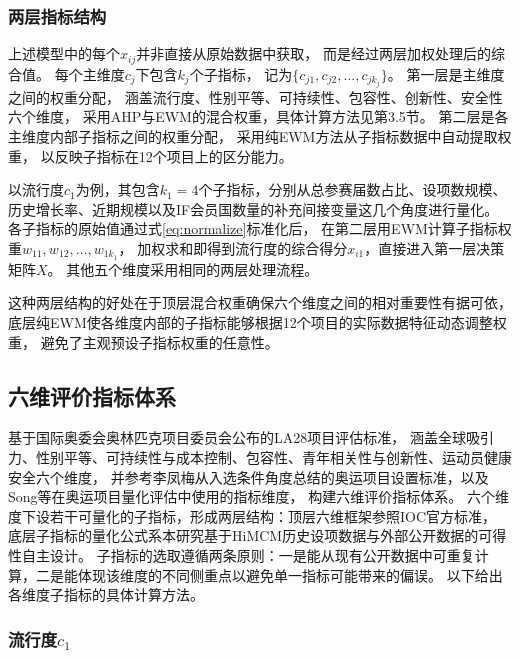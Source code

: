 \documentclass[twoside]{CUGThesis}
\begin{document}
\subsubsection{两层指标结构}

上述模型中的每个$x_{ij}$并非直接从原始数据中获取，
而是经过两层加权处理后的综合值。
每个主维度$c_j$下包含$k_j$个子指标，
记为$\{c_{j1}, c_{j2}, \ldots, c_{jk_j}\}$。
第一层是主维度之间的权重分配，
涵盖流行度、性别平等、可持续性、包容性、创新性、安全性六个维度，
采用AHP与EWM的混合权重，具体计算方法见第3.5节。
第二层是各主维度内部子指标之间的权重分配，
采用纯EWM方法从子指标数据中自动提取权重，
以反映子指标在12个项目上的区分能力。

以流行度$c_1$为例，其包含$k_1 = 4$个子指标，分别从总参赛届数占比、设项数规模、历史增长率、近期规模以及IF会员国数量的补充间接变量这几个角度进行量化。
各子指标的原始值通过式\eqref{eq:normalize}标准化后，
在第二层用EWM计算子指标权重$w_{11}, w_{12}, \ldots, w_{1k_1}$，
加权求和即得到流行度的综合得分$x_{i1}$，直接进入第一层决策矩阵$X$。
其他五个维度采用相同的两层处理流程。

这种两层结构的好处在于顶层混合权重确保六个维度之间的相对重要性有据可依，
底层纯EWM使各维度内部的子指标能够根据12个项目的实际数据特征动态调整权重，
避免了主观预设子指标权重的任意性。

\subsection{六维评价指标体系}

基于国际奥委会奥林匹克项目委员会公布的LA28项目评估标准\cite{IOC2023}，
涵盖全球吸引力、性别平等、可持续性与成本控制、包容性、青年相关性与创新性、运动员健康安全六个维度，
并参考李凤梅\cite{Li2013}从入选条件角度总结的奥运项目设置标准，以及Song等\cite{Song2025}在奥运项目量化评估中使用的指标维度，
构建六维评价指标体系。
六个维度下设若干可量化的子指标，形成两层结构：顶层六维框架参照IOC官方标准\cite{IOC2023,IOC2024}，
底层子指标的量化公式系本研究基于HiMCM历史设项数据与外部公开数据的可得性自主设计。
子指标的选取遵循两条原则：一是能从现有公开数据中可重复计算，二是能体现该维度的不同侧重点以避免单一指标可能带来的偏误。
以下给出各维度子指标的具体计算方法。

\subsubsection{流行度$c_1$}
\end{document}
